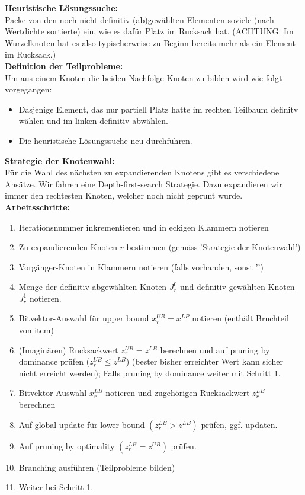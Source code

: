 \textbf{Heuristische Lösungssuche:}\\
Packe von den noch nicht definitiv (ab)gewählten Elementen soviele (nach Wertdichte sortierte) ein, wie es dafür Platz im Rucksack hat. (ACHTUNG: Im Wurzelknoten hat es also typischerweise zu Beginn bereits mehr als ein Element im Rucksack.)\\

\textbf{Definition der Teilprobleme:}\\
Um aus einem Knoten die beiden Nachfolge-Knoten zu bilden wird wie folgt vorgegangen:
\begin{itemize}
	\item Dasjenige Element, das nur partiell Platz hatte im rechten Teilbaum definitv wählen und im linken definitiv abwählen.
	\item Die heuristische Lösungssuche neu durchführen.
\end{itemize}

\textbf{Strategie der Knotenwahl:}\\
Für die Wahl des nächsten zu expandierenden Knotens gibt es verschiedene Ansätze. Wir fahren eine Depth-first-search Strategie. Dazu expandieren wir immer den rechtesten Knoten, welcher noch nicht geprunt wurde.\\
 
\textbf{Arbeitsschritte:}
\begin{enumerate}
	\item Iterationsnummer inkrementieren und in eckigen Klammern notieren
	\item Zu expandierenden Knoten $r$ bestimmen (gemäss 'Strategie der Knotenwahl')
	\item Vorgänger-Knoten in Klammern notieren (falls vorhanden, sonst '.')
	\item Menge der definitiv abgewählten Knoten $J^0_r$ und definitiv gewählten Knoten $J^1_r$ notieren.
	\item Bitvektor-Auswahl für upper bound $x_r^{UB}=x^{LP}$ notieren (enthält Bruchteil von item)
	\item (Imaginären) Rucksackwert $z_r^{UB}=z^{LB}$ berechnen und auf pruning by dominance prüfen ($z_r^{UB}\le z^{LB}$) (bester bisher erreichter Wert kann sicher nicht erreicht werden); Falls pruning by dominance weiter mit Schritt 1.
	\item Bitvektor-Auswahl $x_r^{LB}$ notieren und zugehörigen Rucksackwert $z_r^{LB}$ berechnen
	\item Auf global update für lower bound $(z_r^{LB} > z^{LB})$ prüfen, ggf. updaten.
	\item Auf pruning by optimality $(z_r^{LB} = z^{UB})$ prüfen.
	\item Branching ausführen (Teilprobleme bilden)
	\item Weiter bei Schritt 1.
\end{enumerate}

